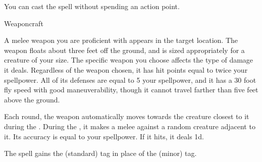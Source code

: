 You can cast the spell without spending an action point.




\newpage
\begin{spellsection}{Weaponcraft}

\begin{spellheader}
\end{spellheader}

\begin{spellcontent}

\begin{spelltargetinginfo}




\end{spelltargetinginfo}


\begin{spelleffects}



\spelleffect
A melee weapon you are proficient with appears in the target location.
The weapon floats about three feet off the ground, and is sized appropriately for a creature of your size.
The specific weapon you choose affects the type of damage it deals.
Regardless of the weapon chosen, it has hit points equal to twice your spellpower.
All of its defenses are equal to 5 \add your spellpower, and it has a 30 foot fly speed with good maneuverability, though it cannot travel farther than five feet above the ground.

Each round, the weapon automatically moves towards the creature closest to it during the .
During the , it makes a melee  against a random creature adjacent to it.
Its accuracy is equal to your spellpower.
If it hits, it deals  \minus1d.








\end{spelleffects}

\end{spellcontent}
\begin{spellfooter}


\end{spellfooter}
\begin{spellsubcontent}


\begin{spellcantrip}
The spell gains the  (standard) tag in place of the  (minor) tag.
\end{spellcantrip}


\end{spellsubcontent}
\end{spellsection}


